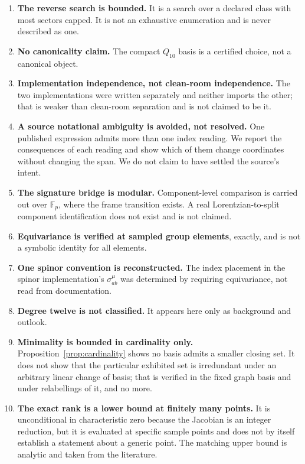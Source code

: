 \documentclass[11pt,a4paper]{article}
\begin{document}
\begin{enumerate}
      \emph{Also settled.} $\dim_{\mathbb{Q}}(B_{10}\cap P_{10})
      \bpCapRelation \bpCapQ$ likewise. The published-candidate coordinates were
      lifted to $\mathbb{Q}$ by the same route --- CRT across $\bpFitPrimes$
      primes, rational reconstruction, validation at a held-out
      prime~$\bpHoldoutPrime$ --- and the intersection is generated by an
      explicit integer identity, given in section~\ref{sec:decomp}.
\item \textbf{The reverse search is bounded.} It is a search over a declared
      class with most sectors capped. It is not an exhaustive enumeration and is
      never described as one.
\item \textbf{No canonicality claim.} The compact $Q_{10}$ basis is a certified
      choice, not a canonical object.
\item \textbf{Implementation independence, not clean-room independence.} The two
      implementations were written separately and neither imports the other;
      that is weaker than clean-room separation and is not claimed to be it.
\item \textbf{A source notational ambiguity is avoided, not resolved.} One
      published expression admits more than one index reading. We report the
      consequences of each reading and show which of them change coordinates
      without changing the span. We do not claim to have settled the source's
      intent.
\item \textbf{The signature bridge is modular.} Component-level comparison is
      carried out over $\mathbb{F}_p$, where the frame transition exists. A real
      Lorentzian-to-split component identification does not exist and is not
      claimed.
\item \textbf{Equivariance is verified at sampled group elements}, exactly, and
      is not a symbolic identity for all elements.
\item \textbf{One spinor convention is reconstructed.} The index placement in the
      spinor implementation's $\sigma^\mu_{ab}$ was determined by requiring
      equivariance, not read from documentation.
\item \textbf{Degree twelve is not classified.} It appears here only as
      background and outlook.
\item \textbf{Minimality is bounded in cardinality only.}
      Proposition~\ref{prop:cardinality} shows no basis admits a smaller closing
      set. It does not show that the particular exhibited set is irredundant
      under an arbitrary linear change of basis; that is verified in the fixed
      graph basis and under relabellings of it, and no more.
\item \textbf{The exact rank is a lower bound at finitely many points.} It is
      unconditional in characteristic zero because the Jacobian is an integer
      reduction, but it is evaluated at specific sample points and does not by
      itself establish a statement about a generic point. The matching upper
      bound is analytic and taken from the literature.
\end{enumerate}
\end{document}
